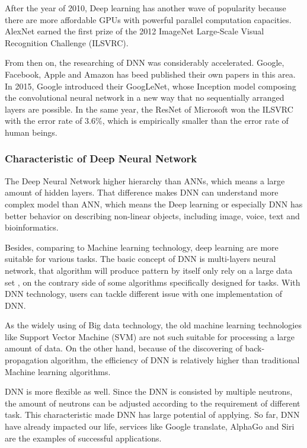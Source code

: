 \documentclass[article]{aaltoseries}
\begin{document}
After the year of 2010, Deep learning has another wave of popularity because there are more affordable GPUs with powerful 
parallel computation capacities. AlexNet\cite{NIPS2012_4824} earned the first prize of 
the 2012 ImageNet Large-Scale Visual Recognition Challenge (ILSVRC). 

From then on, the researching of DNN was considerably accelerated. Google, Facebook, Apple and Amazon has beed published
their own papers in this area. In 2015, Google introduced their GoogLeNet\cite{GoogLeNet}, whose Inception model composing the convolutional 
neural network in a new way that no sequentially arranged layers are possible. In the same year, the ResNet\cite{ResNet} of Microsoft won 
the ILSVRC with the error rate of 3.6\%, which is empirically smaller than the error rate of human beings.




\subsubsection{Characteristic of Deep Neural Network}

The Deep Neural Network higher hierarchy than ANNs, which means a large amount of hidden layers\cite{MAL-006}. 
That difference makes DNN can understand more complex model than ANN, which means the Deep learning or especially DNN
has better behavior on describing non-linear objects, including image, voice, text and bioinformatics.

Besides, comparing to Machine learning technology, deep learning are more suitable for various tasks. The basic concept
of DNN is multi-layers neural network, that algorithm will produce pattern by itself only rely on a large data set
, on the contrary side of some algorithms specifically designed for tasks. With DNN technology, users can tackle different
issue with one implementation of DNN. 

As the widely using of Big data technology, the old machine learning technologies like Support Vector Machine (SVM) are
not such suitable for processing a large amount of data. On the other hand, because of the discovering of back-propagation
algorithm, the efficiency of DNN is relatively higher than traditional Machine learning algorithms.

DNN is more flexible as well. Since the DNN is consisted by multiple neutrons, the amount of neutrons can be adjusted
according to the requirement of different task. This characteristic made DNN has large potential of applying. So far, 
DNN have already impacted our life, services like Google translate, AlphaGo and Siri are the examples of successful applications.
\end{document}
